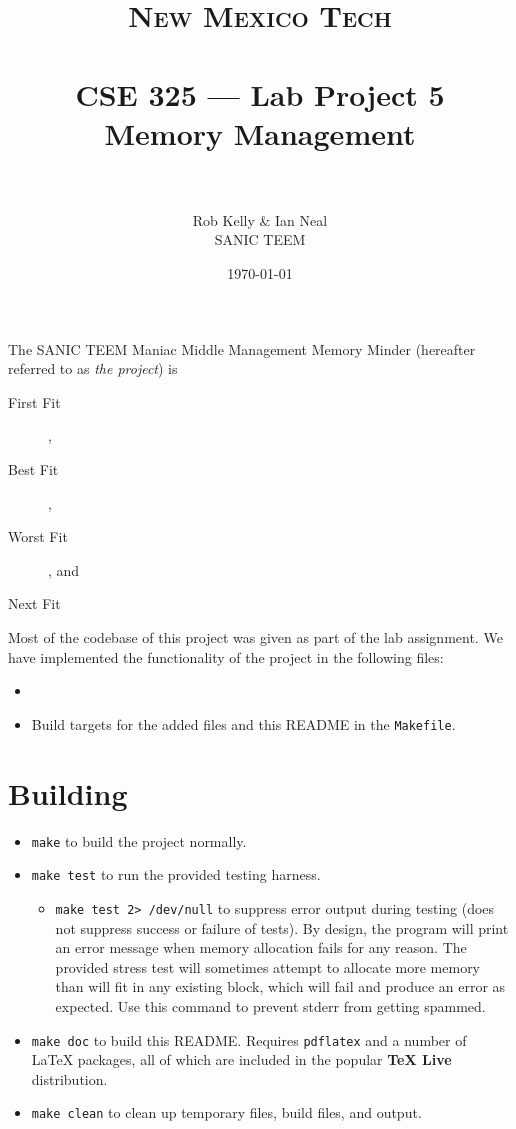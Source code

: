 \documentclass[paper=a4, fontsize=11pt]{scrartcl}
\title{
  \normalfont \normalsize 
  \textsc{New Mexico Tech} \\ [25pt]
  \horrule{0.5pt} \\[0.4cm]
  \huge CSE 325 --- Lab Project 5 \\ Memory Management \\
  \horrule{2pt} \\[0.5cm]
}
\author{Rob Kelly \& Ian Neal \\ SANIC TEEM}
\date{\normalsize\today}
\begin{document}
\maketitle

The SANIC TEEM Maniac Middle Management Memory Minder (hereafter referred to as \textit{the project}) is 

\begin{description}
  \item[First Fit] ,

  \item[Best Fit] ,

  \item[Worst Fit] , and

  \item[Next Fit]
\end{description}

Most of the codebase of this project was given as part of the lab assignment. We have implemented the functionality of the project in the following files:

\begin{itemize}
  \item 

  \item Build targets for the added files and this README in the \texttt{Makefile}.
\end{itemize}

\section*{Building}
\begin{itemize}
  \item \texttt{make} to build the project normally.

  \item \texttt{make test} to run the provided testing harness.
  \begin{itemize}
    \item \texttt{make test 2> /dev/null} to suppress error output during testing (does not suppress success or failure of tests). By design, the program will print an error message when memory allocation fails for any reason. The provided stress test will sometimes attempt to allocate more memory than will fit in any existing block, which will fail and produce an error as expected. Use this command to prevent stderr from getting spammed.
  \end{itemize}

  \item \texttt{make doc} to build this README. Requires \texttt{pdflatex} and a number of \LaTeX\hspace{0em} packages, all of which are included in the popular \textbf{TeX Live} distribution.

  \item \texttt{make clean} to clean up temporary files, build files, and output.
\end{itemize} 
\end{document}
